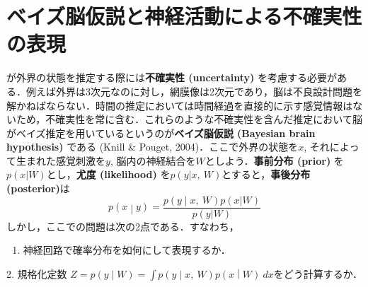 \section{ベイズ脳仮説と神経活動による不確実性の表現}
が外界の状態を推定する際には\textbf{不確実性 (uncertainty)} を考慮する必要がある．例えば外界は3次元なのに対し，網膜像は2次元であり，脳は不良設計問題を解かねばならない．時間の推定においては時間経過を直接的に示す感覚情報はないため，不確実性を常に含む．これらのような不確実性を含んだ推定において脳がベイズ推定を用いているというのが\textbf{ベイズ脳仮説 (Bayesian brain hypothesis)} である (Knill & Pouget, 2004)．ここで外界の状態を$x$, それによって生まれた感覚刺激を$y$, 脳内の神経結合を$W$としよう．\textbf{事前分布 (prior)} を$p(x|W)$とし，\textbf{尤度 (likelihood)} を$p(y|x,\ W)$とすると，\textbf{事後分布 (posterior)}は
\begin{equation}
p\left( x \middle| y \right) = \frac{p\left( y \middle| x,\ W \right)p(x|W)}{p(y|W)}
\end{equation}
しかし，ここでの問題は次の2点である．すなわち，
\begin{enumerate}
\item  神経回路で確率分布を如何にして表現するか．
\end{enumerate}
2.  規格化定数 $Z = p\left( y \middle| W \right) = \int p\left( y \middle| x,\ W \right)p\left( x \middle| W \right)\ dx$をどう計算するか．
